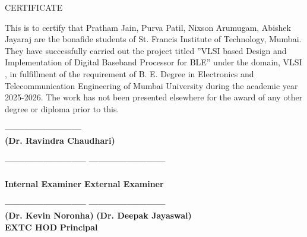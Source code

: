 \documentclass[12pt,singleside,a4paper]{report}
\begin{document}


\vspace{7.5cm}
\begin{center}
\Huge{CERTIFICATE}
\end{center}
\vspace{2cm}
This is to certify that Pratham Jain, Purva Patil, Nixson Arumugam, Abishek Jayaraj are the bonafide students of St. Francis Institute
of Technology, Mumbai. They have successfully carried out the project
titled ''VLSI based Design and Implementation of Digital Baseband Processor for BLE'' under the domain, VLSI , in fulfillment
of the requirement of B. E. Degree in Electronics and Telecommunication
Engineering of Mumbai University during the academic year 2025-2026.
The work has not been presented elsewhere for the award of any other
degree or diploma prior to this.


\vspace{2cm}

\begin{flushleft}

\textbf{------------------------ }\\
\hspace{4.00mm}
\textbf{(Dr. Ravindra Chaudhari)} 
\\

\newline
\end{flushleft}
\vspace{1.7cm}
\begin{flushleft}
\textbf{-------------------------- } \hspace{65.00mm} \textbf{------------------------ }\\

\\
\hspace{3.00mm}\textbf{Internal Examiner} \hspace{64.00mm}\textbf{External Examiner}
\end{flushleft}



\vspace{1.7cm}
\begin{flushleft}
\textbf{-------------------------- } \hspace{65.00mm} \textbf{------------------------ }\\
\textbf{(Dr. Kevin Noronha)} \hspace{60.00mm}\textbf{(Dr. Deepak Jayaswal)}
\\
\hspace{8.00mm}\textbf{EXTC HOD} \hspace{84.00mm}\textbf{Principal}
\end{flushleft}
\end{document}
